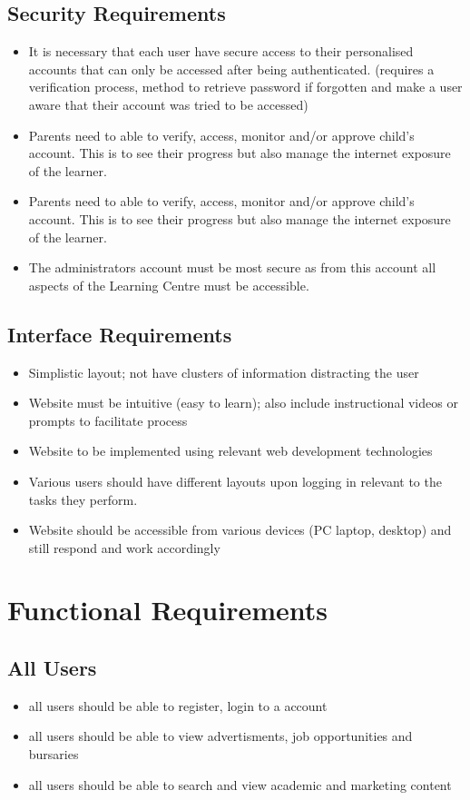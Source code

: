 \documentclass[10pt]{article}
\begin{document}
\subsection*{Security Requirements}
\begin{itemize}
\item It is necessary that each user have secure access to their personalised accounts that can only be accessed after being authenticated. (requires a verification process, method to retrieve password if forgotten and make a user aware that their account was tried to be accessed)
\item Parents need to able to verify, access, monitor and/or approve child’s account. This is to see their progress but also manage the internet exposure of the learner.
\item Parents need to able to verify, access, monitor and/or approve child’s account. This is to see their progress but also manage the internet exposure of the learner.
\item The administrators account must be most secure as from this account all aspects of the Learning Centre must be accessible.
\end{itemize}

\subsection*{Interface Requirements}
\begin{itemize}
\item Simplistic layout; not have clusters of information distracting the user
\item Website must be intuitive (easy to learn); also include instructional videos or prompts to facilitate process
\item Website to be implemented using relevant web development technologies
\item Various users should have different layouts upon logging in relevant to the tasks they perform.
\item Website should be accessible from various devices (PC laptop, desktop) and still respond and work accordingly
\end{itemize}

\section*{Functional Requirements}
\subsection*{All Users}
\begin{itemize}
\item all users should be able to register, login to a account
\item all users should be able to view advertisments, job opportunities and bursaries
\item all users should be able to search and view academic and marketing content
\end{itemize}
\end{document}
